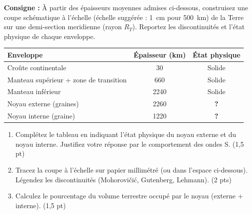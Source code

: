 \documentclass[11pt]{article}
\begin{document}
\begin{exercice}
    \textbf{Consigne :} À partir des épaisseurs moyennes admises ci-dessous, construisez une coupe schématique à l'échelle (échelle suggérée : \SI{1}{cm} pour \SI{500}{km}) de la Terre sur une demi-section meridienne (rayon $R_T$). Reportez les discontinuités et l'état physique de chaque enveloppe.
    
    \begin{center}
    \begin{tabular}{|l|c|c|}
    \hline
    \textbf{Enveloppe} & \textbf{Épaisseur (km)} & \textbf{État physique} \\
    \hline
    Croûte continentale & 30 & Solide \\
    \hline
    Manteau supérieur + zone de transition & 660 & Solide \\
    \hline
    Manteau inférieur & 2240 & Solide \\
    \hline
    Noyau externe (graines) & 2260 & \textbf{?} \\
    \hline
    Noyau interne (graine) & 1220 & \textbf{?} \\
    \hline
    \end{tabular}
    \end{center}
    
    \begin{enumerate}
        \item Complétez le tableau en indiquant l'état physique du noyau externe et du noyau interne. Justifiez votre réponse par le comportement des ondes S. (1,5 pt)
        \item Tracez la coupe à l'échelle sur papier millimétré (ou dans l'espace ci-dessous). Légendez les discontinuités (Mohorovičić, Gutenberg, Lehmann). (2 pts)
        \item Calculez le pourcentage du volume terrestre occupé par le noyau (externe + interne). (1,5 pt)
    \end{enumerate}
\end{exercice}
\end{document}
